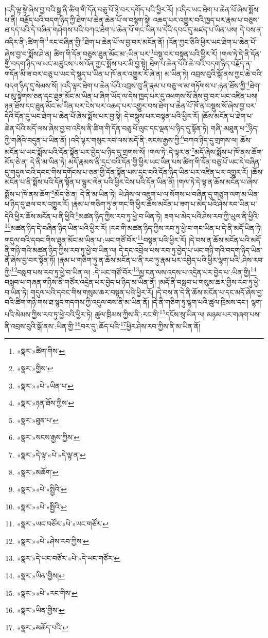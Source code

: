 །འདི་ལྟ་སྟེ་ཞེས་བྱ་བའི་སྒྲ་ནི་ཚིག་གི་དོན་བཅུ་པོ་ཉེ་བར་དགོད་པའི་ཕྱིར་རོ། །འདིར་ཡང་ཐེག་པ་ཆེན་པོ་ཞེས་སྨོས་པ་ནི། བརྗོད་པའི་བདག་ཉིད་ཀྱི་ཐེག་པ་ཆེན་ཆེན་པོ་ལ་བསྙག་སྟེ། འཆད་པར་འགྱུར་བའི་ཁྱད་པར་རྣམ་པ་བཅུས་ཐ་དད་པའི་དེ་བཞིན་གཤེགས་པའི་བཀའ་ཐེག་པ་ཆེན་པོ་གང་ཡིན་པ་དེའི་དབང་དུ་མཛད་པ་ཡིན་པས། དེ་བས་ན་འདིར་ནི་:ཚིག་གི་\footnote{«སྣར་»ཚིག་གིས་}རང་བཞིན་གྱི་\footnote{«སྣར་»གྱིས་}ཐེག་པ་ཆེན་པོ་ལ་བྱ་བར་མངོན་ནོ། །འོན་ཀྱང་ཅིའི་ཕྱིར་ཡང་ཐེག་པ་ཆེན་པོ་ཞེས་བྱ་བ་སྨོས་ཤེ་ན། ཚིག་གི་དོན་བཅུས་ཐུན་མོང་མ་:ཡིན་པར་\footnote{«སྣར་»«པེ་»ཡིན་པ་}བསྡུ་བར་བསྟན་པའི་ཕྱིར་རོ། །གལ་ཏེ་དེ་ནི་དོན་གྱི་བདག་ཉིད་ལ་ཡང་མཚུངས་པས་འོན་ཀྱང་སྨོས་པར་མི་བྱ་སྟེ། ཐེག་པ་ཆེན་པོའི་ཆེ་བའི་བདག་ཉིད་བརྗོད་ན་གདོན་མི་ཟ་བར་བཅུ་པ་ཡང་དེ་སྡུད་པ་ཡིན་པ་ཁོ་ནར་འགྱུར་རོ་ཞེ་ན། མ་ཡིན་ཏེ། འབྲས་བུའི་སྒོ་ནས་ཀྱང་ཆེ་བའི་བདག་ཉིད་དུ་སེམས་སོ། །འདི་ལྟར་ཐེག་པ་ཆེན་པོའི་འབྲས་བུ་ནི་རྣམ་པ་བཅུ་ལ་མ་གཏོགས་པ་:ཉན་ཐོས་ཀྱི་\footnote{«སྣར་»ཉན་ཐོས་ཀྱིས་}ཐེག་པ་མུ་སྟེགས་ཅན་དང་ཐུན་མོང་མ་ཡིན་པ་ཞིག་ཡོད་ལ་དེས་ཁྱད་པར་དུ་འཕགས་སོ་ཞེས་བྱ་བར་ཡང་འཛིན་པས། ཉན་ཐོས་དང་ཐུན་མོང་མ་ཡིན་པར་ངེས་པར་འཆད་པར་འགྱུར་བས་ཐེག་པ་ཆེན་པོ་ཁོ་ན་བསྡུས་སོ་ཞེས་བྱ་བར་དེའི་དོན་དུ་ཡང་ཐེག་པ་ཆེན་པོ་ཞེས་སྨོས་པར་བྱ་སྟེ། དེ་བསྡུས་པར་བསྟན་པའི་ཕྱིར་རོ། །ཆོས་མངོན་པ་ཐེག་པ་ཆེན་པོའི་མདོ་ལས་ཞེས་བྱ་བ་འདིས་ནི་ཚིག་གི་དོན་བཅུ་པོ་ལུང་དང་ལྡན་པ་ཉིད་དུ་སྟོན་ཏེ། གཞི་:མཐུན་པ་\footnote{«སྣར་»ཐུན་པ་}ཉིད་ཀྱི་གཞིའི་བདུན་པ་ཡིན་ནོ། །འདི་ལྟར་གསུང་རབ་ལས་མདོ་ནི་:སངས་རྒྱས་ཀྱི་\footnote{«སྣར་»སངས་རྒྱས་ཀྱིས་}བཀའ་ཉིད་དུ་གྲགས་ལ། ཆོས་མངོན་པ་ཡང་སྨོས་པའི་དོན་སྟོན་པར་བྱེད་པ་ཉིད་དུ་གྲགས་སོ། །གལ་ཏེ་:དེ་ལྟར་ན་\footnote{«སྣར་»དེ་ལྟ་«པེ་»དེ་ལྟ་ན་}མདོ་ཞེས་སྨོས་པ་ཁོ་ནས་ཆོག་མོད་ཅེ་ན། དེ་ནི་མ་ཡིན་ཏེ། མདོ་རྣམས་ནི་དྲང་བའི་དོན་གྱི་ཕྱིར་ཡང་ཡིན་པས་ཚིག་གི་དོན་བཅུ་པོ་ཡང་དེ་བཞིན་དུ་གདུལ་བའི་དབང་གིས་དགོངས་པ་ཅན་གྱི་དོན་སྟོན་པས་དྲང་བའི་དོན་ཉིད་ཡིན་པར་འཛིན་པར་འགྱུར་རོ། །ཆོས་མངོན་པ་ནི་སྨོས་པའི་དོན་སྟོན་པ་ལྷུར་ལེན་པའི་ཕྱིར་ངེས་པའི་དོན་ཡིན་ནོ། །གལ་ཏེ་དེ་ལྟ་ན་ཆོས་མངོན་པ་ཞེས་སྨོས་པ་ཁོ་ནས་ཆོག་\footnote{«སྣར་»མཆོག་}མོད་ཅེ་ན། དེ་ནི་མ་ཡིན་ཏེ། ཡེ་ཤེས་ལ་འཇུག་པ་ལ་སོགས་པ་བཞིན་དུ་གཙུག་ལག་མ་ཡིན་པ་ཉིད་དུ་ཐལ་བར་འགྱུར་རོ། །རྣམ་པ་གཅིག་ཏུ་ན་གང་གི་ཕྱིར་ཆོས་མངོན་པ་ཟག་པ་མེད་པའི་ཤེས་རབ་ཡིན་པ་དེའི་ཕྱིར་ཆོས་མངོན་པ་ནི་ཕྱིའི་\footnote{«སྣར་»«པེ་»སྤྱིའི་}མཚན་ཉིད་ཀྱིས་རབ་ཏུ་ཕྱེ་བ་ཡིན་ཏེ། ཟག་པ་མེད་པའི་ཤེས་རབ་ཀྱི་ཡུལ་ནི་ཕྱིའི་\footnote{«སྣར་»«པེ་»སྤྱིའི་}མཚན་ཉིད་དེ་བཞིན་ཉིད་ཡིན་པའི་ཕྱིར་རོ། །རང་གི་མཚན་ཉིད་ཀྱིས་རབ་ཏུ་ཕྱེ་བ་གང་ཡིན་པ་དེ་ནི་མདོ་ཡིན་ཏེ། གདུལ་བའི་དབང་གིས་ཐུན་མོང་མ་ཡིན་པ་:ཡང་གཙོ་བོར་\footnote{«སྣར་»ཡང་བཙོར་«པེ་»ཡང་གཙོར་}བསྟན་པའི་ཕྱིར་རོ། །དེ་བས་ན་ཆོས་མངོན་པའི་མདོ་ནི་གཉི་གའི་མཚན་ཉིད་ཀྱིས་རབ་ཏུ་ཕྱེ་བ་ཡིན་ལ། དེ་དང་འབྲེལ་པས་རབ་ཏུ་བྱེད་པ་ཡང་གཉི་གའི་བདག་ཉིད་ཡིན་ནོ་ཞེས་བྱ་བར་སྟོན་ཏོ། །རྣམ་པ་གཅིག་ཏུ་ན་ཆོས་མངོན་པ་ནི་རབ་ཏུ་རྣམ་པར་འབྱེད་པའི་ཕྱིར་ལྷག་པའི་:ཤེས་རབ་ཀྱི་\footnote{«སྣར་»«པེ་»ཤེས་རབ་ཀྱིས་}བསླབ་པས་རབ་ཏུ་ཕྱེ་བ་ཡིན་ལ། :དེ་ཡང་གཙོ་བོར་\footnote{«སྣར་»དེ་ཡང་བཙོར་«པེ་»དེ་ཡང་གཙོར་}མྱ་ངན་ལས་འདས་པ་འདྲེན་པར་བྱེད་པ་:ཡིན་གྱི།\footnote{«སྣར་»ཡིན་གྱིས།} བསླབ་པ་གཞན་གཉིས་ནི་གཙོར་འདྲེན་པར་བྱེད་པ་ཉིད་མ་ཡིན་ནོ། །མདོ་ནི་བསླབ་པ་གསུམ་ཆར་གྱིས་རབ་ཏུ་ཕྱེ་བ་ཡིན་ཏེ། གདུལ་པའི་དབང་གིས་གསུམ་ཆར་བསྟན་པའི་ཕྱིར་རོ། །དེ་བས་ན་དེ་ནི་ཆོས་མངོན་པ་དང་མདོ་ཞེས་བྱ་བའི་ཚིག་གཉི་གས་ཐ་སྙད་གདགས་ཀྱི་འདུལ་བས་ནི་མ་ཡིན་ནོ། །དེ་ནི་གཅིག་ཏུ་ལྷག་པའི་ཚུལ་ཁྲིམས་དང་། ལྷག་པའི་སེམས་ཀྱིས་རབ་ཏུ་ཕྱེ་བའི་ཕྱིར་ཏེ། ཚུལ་ཁྲིམས་ཀྱིས་ནི་:རང་གི་\footnote{«སྣར་»«པེ་»རང་གིས་}དངོས་སུ་ཡིན་ལ། མཉམ་པར་གཞག་པས་ནི་འབྲས་བུའི་སྒོ་ནས་:ཡིན་གྱི་\footnote{«སྣར་»ཡིན་གྱིས་}བར་དུ་:ཆོད་པའི་\footnote{«སྣར་»མཆོད་པའི་}ཕྱིར་ཤེས་རབ་ཀྱིས་ནི་མ་ཡིན་ནོ། 